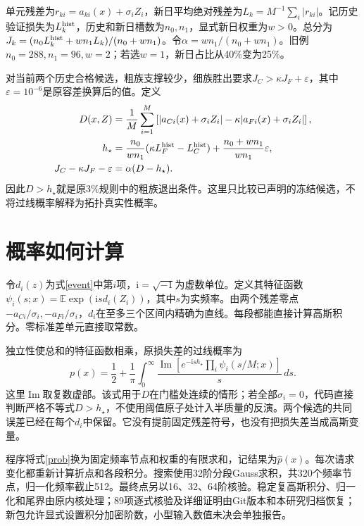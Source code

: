 \documentclass[UTF8,11pt,a4paper,fontset=fandol]{ctexart}
\newcommand{\E}{\mathbb E}\newcommand{\Prob}{\mathbb P}\newcommand{\code}[1]{\texttt{\detokenize{#1}}}
\begin{document}
单元残差为$r_{ki}=a_{ki}(x)+\sigma_iZ_i$，新日平均绝对残差为$L_k=M^{-1}\sum_i|r_{ki}|$。记历史验证损失为$L_k^{\rm hist}$，历史和新日槽数为$n_0,n_1$，显式新日权重为$w>0$。总分为$J_k=(n_0L_k^{\rm hist}+wn_1L_k)/(n_0+wn_1)$。令$\alpha=wn_1/(n_0+wn_1)$。旧例$n_0=288,n_1=96,w=2$；若选$w=1$，新日占比从40\%变为25\%。

对当前两个历史合格候选，粗族支撑较少，细族胜出要求$J_C>\kappa J_F+\varepsilon$，其中$\varepsilon=10^{-6}$是原容差换算后的值。定义
\begin{equation}
\begin{aligned}
D(x,Z)&=\frac1M\sum_{i=1}^M\left[
|a_{Ci}(x)+\sigma_iZ_i|-\kappa|a_{Fi}(x)+\sigma_iZ_i|\right],\\
h_\star&=\frac{n_0}{wn_1}(\kappa L_F^{\rm hist}-L_C^{\rm hist})+\frac{n_0+wn_1}{wn_1}\varepsilon,\\
J_C-\kappa J_F-\varepsilon&=\alpha(D-h_\star).
\end{aligned}
\label{event}
\end{equation}
因此$D>h_\star$就是原3\%规则中的粗族退出条件。这里只比较已声明的冻结候选，不将过线概率解释为拓扑真实性概率。

\section{概率如何计算}
令$d_i(z)$为式\eqref{event}中第$i$项，$\mathrm i=\sqrt{-1}$为虚数单位。定义其特征函数$\psi_i(s;x)=\E\exp(\mathrm i s d_i(Z_i))$，其中$s$为实频率。由两个残差零点$-a_{Ci}/\sigma_i,-a_{Fi}/\sigma_i$，$d_i$在至多三个区间内精确为直线。每段都能直接计算高斯积分。零标准差单元直接取常数。

独立性使总和的特征函数相乘，原损失差的过线概率为
\begin{equation}
\boxed{p(x)=\frac12+\frac1\pi\int_0^\infty
\frac{\operatorname{Im}\left[e^{-\mathrm i s h_\star}
\prod_i\psi_i(s/M;x)\right]}{s}\,ds.}
\label{prob}
\end{equation}
这里$\operatorname{Im}$取复数虚部。该式用于$D$在门槛处连续的情形；若全部$\sigma_i=0$，代码直接判断严格不等式$D>h_\star$，不使用阈值原子处计入半质量的反演。两个候选的共同误差已经在每个$d_i$中保留。它没有提前固定残差符号，也没有把损失差当成高斯变量。

程序将式\eqref{prob}换为固定频率节点和权重的有限求和，记结果为$\widehat p(x)$。每次请求变化都重新计算折点和各段积分。搜索使用32阶分段Gauss求积，共320个频率节点，归一化频率截止512。最终点另以16、32、64阶核验。稳定复高斯积分、归一化和尾界由原内核处理；89项逐式核验及详细证明由Git版本\code{78eb5b17}和本研究归档恢复；新包允许显式设置积分加密阶数，小型输入数值未决会单独报告。
\end{document}
